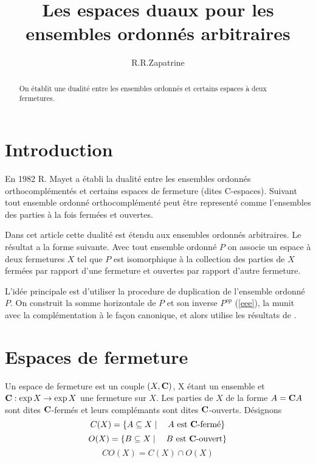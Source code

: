 \author{R.R.Zapatrine}
\date{} 

\title{Les espaces duaux pour les ensembles ordonn\'es arbitraires} 

\def\dff{\sc} 
\def\C{{\bf C}} 
\def\mor{{\tt Mor}} 
\def\b{{\bf B}_2} 
\def\clos{{\tt clos}} 
\def\endproof{\hspace*{\fill}$\Box$}
\def\fix{{\tt Fix}}
\newtheorem{th}{Th\'eor\`eme} 
\newtheorem{lemma}[th]{Lemma} 


\maketitle 

\begin{abstract} 
On \' etablit une dualit\' e entre les ensembles ordonn\' es et 
certains espaces \`a deux fermetures. 
\end{abstract} 

\section{Introduction} 

En 1982 R. Mayet a \'etabli la dualit\'e entre les 
ensembles ordonn\'es orthocompl\'ement\'es et certains espaces de 
fermeture (dites C-espaces). Suivant \cite{mayet} tout ensemble 
ordonn\'e orthocompl\'ement\'e peut \^etre represent\'e comme 
l'ensembles des parties \`a la fois ferm\'ees et ouvertes. 

Dans cet article cette dualit\'e est \'etendu aux ensembles 
ordonn\'es arbitraires. Le r\'esultat a la forme suivante. Avec 
tout ensemble ordonn\'e $P$ on associe un espace \`a deux 
fermetures $X$ tel que $P$ est isomorphique \`a la collection des 
parties de $X$ ferm\'ees par rapport d'une fermeture et ouvertes 
par rapport d'autre fermeture. 

L'id\'ee principale est d'utiliser la procedure de duplication de 
l'ensemble ordonn\'e $P$. On construit la somme horizontale de $P$ 
et son inverse $P^{op}$ (\ref{eee}), la munit avec la 
compl\'ementation \`a le fa\c con canonique, et alors utilise les 
r\'esultats de \cite{mayet}. 


\section{Espaces de fermeture} 

Un {\dff espace de fermeture}  est un couple $(X,\C)$, X \'etant  
un ensemble et $\C:\exp X\to \exp X$ une fermeture sur $X$. Les 
parties de $X$ de la forme $A=\C A$ sont dites 
{\dff $\C$-ferm\'es} et leurs compl\'emants sont dites 
{\dff $\C$-ouverts}. D\'esignons 
\[
C(X)=\{A\subseteq X\mid\quad A\hbox{ est }\C\hbox{-ferm\'e}\} 
\] 
\[ 
O(X)=\{B\subseteq X\mid\quad B\hbox{ est }\C\hbox{-ouvert}\} 
\]
\[ CO(X) = C(X)\cap O(X) 
\]

